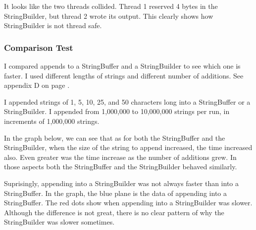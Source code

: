 It looks like the two threads collided. Thread 1 reserved 4 bytes in the StringBuilder, but thread 2 wrote its output. This clearly shows how StringBuilder is not thread safe.

\subsubsection{Comparison Test}
I compared appends to a StringBuffer and a StringBuilder to see which one is faster. I used different lengths of strings and different number of additions. See appendix D on page \pageref{App:AppendixD}.

I appended strings of 1, 5, 10, 25, and 50 characters long into a StringBuffer or a StringBuilder. I appended from 1,000,000 to 10,000,000 strings per run, in increments of 1,000,000 strings.

In the graph below, we can see that as for both the StringBuffer and the StringBuilder, when the size of the string to append increased, the time increased also. Even greater was the time increase as the number of additions grew. In those aspects both the StringBuffer and the StringBuilder behaved similarly.

Suprisingly, appending into a StringBuilder was not always faster than into a StringBuffer. In the graph, the blue plane is the data of appending into a StringBuffer. The red dots show when appending into a StringBuilder was slower. Although the difference is not great, there is no clear pattern of why the StringBuilder was slower sometimes.

\begin{figure}[H]\centering
{}
\label{fig:stringbuildervsStringBuffer}
\end{figure}
